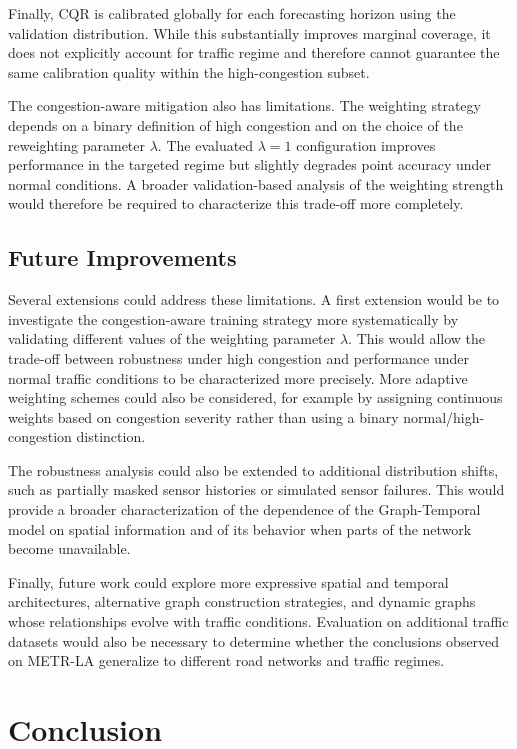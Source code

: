 Finally, CQR is calibrated globally for each forecasting horizon using the
validation distribution. While this substantially improves marginal
coverage, it does not explicitly account for traffic regime and therefore
cannot guarantee the same calibration quality within the high-congestion
subset.


The congestion-aware mitigation also has limitations. The weighting strategy
depends on a binary definition of high congestion and on the choice of the
reweighting parameter $\lambda$. The evaluated $\lambda=1$ configuration
improves performance in the targeted regime but slightly degrades point
accuracy under normal conditions. A broader validation-based analysis of the
weighting strength would therefore be required to characterize this trade-off
more completely.


\subsection{Future Improvements}
\label{subsec:future_improvements}

Several extensions could address these limitations. A first extension would
be to investigate the congestion-aware training
strategy more systematically by validating different values of the weighting
parameter $\lambda$. This would allow the trade-off between robustness under
high congestion and performance under normal traffic conditions to be
characterized more precisely. More adaptive weighting schemes could also be
considered, for example by assigning continuous weights based on congestion
severity rather than using a binary normal/high-congestion distinction.

The robustness analysis could also be extended to additional distribution
shifts, such as partially masked sensor histories or simulated sensor
failures. This would provide a broader characterization of the dependence of
the Graph-Temporal model on spatial information and of its behavior when
parts of the network become unavailable.

Finally, future work could explore more expressive spatial and temporal
architectures, alternative graph construction strategies, and dynamic graphs
whose relationships evolve with traffic conditions. Evaluation on additional
traffic datasets would also be necessary to determine whether the conclusions
observed on METR-LA generalize to different road networks and traffic
regimes.


\section{Conclusion}
\label{sec:conclusion}

